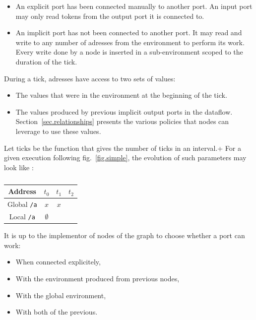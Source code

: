 \documentclass{article}
\begin{document}
\begin{itemize}
  \item An explicit port has been connected manually to another port.
        An input port may only read tokens from the output port it is connected to.
        	      
  \item An implicit port has not been connected to another port. 
        It may read and write to any number of adresses from the environment to perform its work.
        Every write done by a node is inserted in a sub-environment scoped to the duration of the tick.
\end{itemize}
    
During a tick, adresses have access to two sets of values: 
\begin{itemize}
  \item The values that were in the environment at the beginning of the tick.
  \item The values produced by previous implicit output ports in the dataflow.
        Section~\ref{sec.relationships} presents the various policies that nodes can leverage to 
        use these values.
\end{itemize}

Let $\mathrm{ticks}$ be the function that gives the number of ticks in an interval.+
For a given execution following fig.~\ref{fig.simple}, the evolution of such parameters may look like : 


\begin{table}
	\centering
	\begin{tabular}{c|ccc}
		Address & $t_0$ & $t_1$ & $t_2$ \\
		\midrule
		Global \lstinline|/a|  & $x$ & $x $ & \\
		Local \lstinline|/a|   & $\emptyset$ & & \\	
	\end{tabular}
	\caption{}
\end{table}

It is up to the implementor of nodes of the graph to choose whether a port can work: 
\begin{itemize}
  \item When connected explicitely,
  \item With the environment produced from previous nodes,
  \item With the global environment,
  \item With both of the previous.
\end{itemize} 
\end{document}
